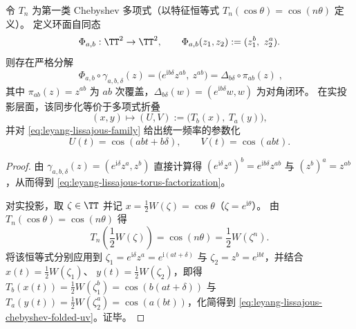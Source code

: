 

\begin{proposition}\label{prop:leyang-lissajous-torus-endomorphism-chebyshev}
令 \(T_n\) 为第一类 Chebyshev 多项式（以特征恒等式 \(T_n(\cos\theta)=\cos(n\theta)\) 定义）。
定义环面自同态
\[
\Phi_{a,b}:\TT^2\to\TT^2,\qquad \Phi_{a,b}(z_1,z_2):=(z_1^b,\ z_2^a).
\]
则存在严格分解
\begin{equation}\label{eq:leyang-lissajous-torus-factorization}
\boxed{\;
\Phi_{a,b}\circ \gamma_{a,b,\delta}(z)
=\bigl(e^{\mathrm{i}b\delta}z^{ab},\ z^{ab}\bigr)
=\Delta_{b\delta}\circ \pi_{ab}(z)\; } ,
\end{equation}
其中 \(\pi_{ab}(z)=z^{ab}\) 为 \(ab\) 次覆盖，\(\Delta_{b\delta}(w)=(e^{\mathrm{i}b\delta}w,w)\) 为对角闭环。
在实投影层面，该同步化等价于多项式折叠
\[
(x,y)\longmapsto (U,V):=\bigl(T_b(x),\ T_a(y)\bigr),
\]
并对 \eqref{eq:leyang-lissajous-family} 给出统一频率的参数化
\begin{equation}\label{eq:leyang-lissajous-chebyshev-folded-uv}
\boxed{\;
U(t)=\cos(abt+b\delta),\qquad V(t)=\cos(abt).\;}
\end{equation}
\end{proposition}
\begin{proof}
由 \(\gamma_{a,b,\delta}(z)=(e^{\mathrm{i}\delta}z^a,z^b)\) 直接计算得
\(
(e^{\mathrm{i}\delta}z^a)^b=e^{\mathrm{i}b\delta}z^{ab}
\)
与
\(
(z^b)^a=z^{ab}
\)，从而得到 \eqref{eq:leyang-lissajous-torus-factorization}。
\par
对实投影，取 \(\zeta\in\TT\) 并记 \(x=\frac12W(\zeta)=\cos\theta\)（\(\zeta=e^{\mathrm{i}\theta}\)）。
由 \(T_n(\cos\theta)=\cos(n\theta)\) 得
\[
T_n\!\left(\frac12W(\zeta)\right)=\cos(n\theta)=\frac12W(\zeta^n).
\]
将该恒等式分别应用到 \(\zeta_1=e^{\mathrm{i}\delta}z^a=e^{\mathrm{i}(at+\delta)}\) 与 \(\zeta_2=z^b=e^{\mathrm{i}bt}\)，并结合
\(
x(t)=\frac12W(\zeta_1)
\)、
\(
y(t)=\frac12W(\zeta_2)
\)，即得
\(
T_b(x(t))=\frac12W(\zeta_1^b)=\cos(b(at+\delta))
\)
与
\(
T_a(y(t))=\frac12W(\zeta_2^a)=\cos(a(bt))
\)，化简得到 \eqref{eq:leyang-lissajous-chebyshev-folded-uv}。证毕。
\end{proof}

